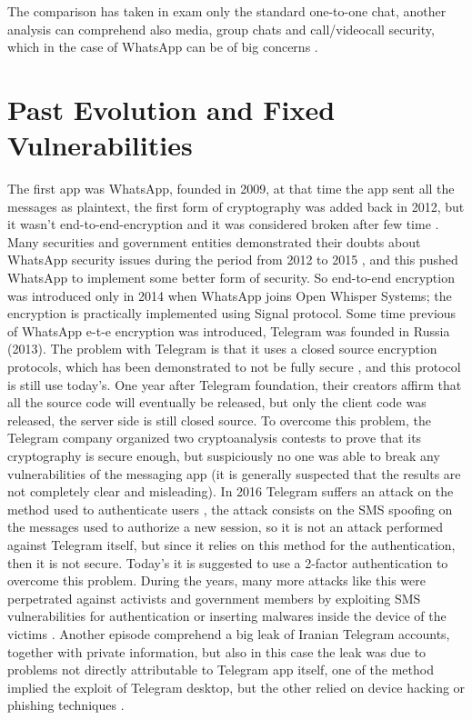\documentclass{article}
\begin{document}
The comparison has taken in exam only the standard one-to-one chat, another analysis can comprehend also media, group chats and call/videocall security, which in the case of WhatsApp can be of big concerns \cite{what_security_threat}.
 

\section{Past Evolution and Fixed Vulnerabilities}

The first app was WhatsApp, founded in 2009, at that time the app sent all the messages as plaintext, the first form of cryptography was added back in 2012, but it wasn't end-to-end-encryption and it was considered broken after few time \cite{what_threat}. Many securities and government entities demonstrated their doubts about WhatsApp security issues during the period from 2012 to 2015 \cite{what_threat}, and this pushed WhatsApp to implement some better form of security. So end-to-end encryption was introduced only in 2014 \cite{what_ete} when WhatsApp joins Open Whisper Systems; the encryption is practically implemented using Signal protocol. Some time previous of WhatsApp e-t-e encryption was introduced, Telegram was founded in Russia (2013). The problem with Telegram is that it uses a closed source encryption protocols, which has been  demonstrated to not be fully secure \cite{MT_insecure}, and this protocol is still use today's. One year after Telegram foundation, their creators affirm that all the source code will eventually be released, but only the client code was released, the server side is still closed source. To overcome this problem, the Telegram company organized two cryptoanalysis contests \cite{contest1} \cite{contest1} to prove that its cryptography is secure enough, but suspiciously no one was able to break any vulnerabilities of the messaging app (it is generally suspected that the results are not completely clear and misleading). \newline
In 2016 Telegram suffers an attack on the method used to authenticate users \cite{2factor}, the attack consists on the SMS spoofing on the messages used to authorize a new session, so it is not an attack performed against Telegram itself, but since it relies on this method for the authentication, then it is not secure. Today's it is suggested to use a 2-factor authentication to overcome this problem. During the years, many more attacks like this were perpetrated against activists and government members by exploiting SMS vulnerabilities for authentication or inserting malwares inside the device of the victims \cite{brasil_leak} \cite{russia_leak} \cite{telegram_gate}. Another episode comprehend a big leak of Iranian Telegram accounts, together with private information, but also in this case the leak was due to problems not directly attributable to Telegram app itself, one of the method implied the exploit of Telegram desktop, but the other relied on device hacking or phishing techniques \cite{iran_leak}. \newline
\end{document}
